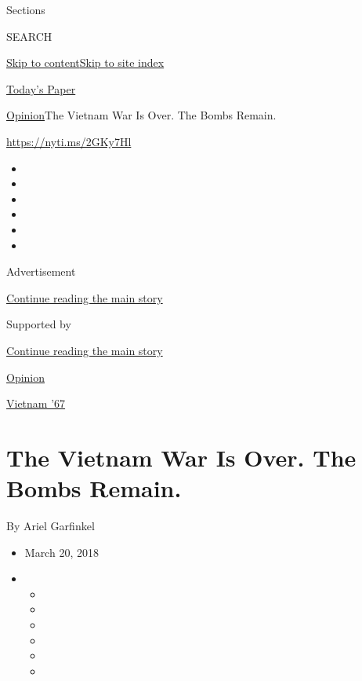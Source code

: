Sections

SEARCH

\protect\hyperlink{site-content}{Skip to
content}\protect\hyperlink{site-index}{Skip to site index}

\href{https://myaccount.nytimes3xbfgragh.onion/auth/login?response_type=cookie\&client_id=vi}{}

\href{https://www.nytimes3xbfgragh.onion/section/todayspaper}{Today's
Paper}

\href{/section/opinion}{Opinion}\textbar{}The Vietnam War Is Over. The
Bombs Remain.

\url{https://nyti.ms/2GKy7Hl}

\begin{itemize}
\item
\item
\item
\item
\item
\item
\end{itemize}

Advertisement

\protect\hyperlink{after-top}{Continue reading the main story}

Supported by

\protect\hyperlink{after-sponsor}{Continue reading the main story}

\href{/section/opinion}{Opinion}

\href{/column/vietnam-67}{Vietnam '67}

\hypertarget{the-vietnam-war-is-over-the-bombs-remain}{%
\section{The Vietnam War Is Over. The Bombs
Remain.}\label{the-vietnam-war-is-over-the-bombs-remain}}

By Ariel Garfinkel

\begin{itemize}
\item
  March 20, 2018
\item
  \begin{itemize}
  \item
  \item
  \item
  \item
  \item
  \item
  \end{itemize}
\end{itemize}

